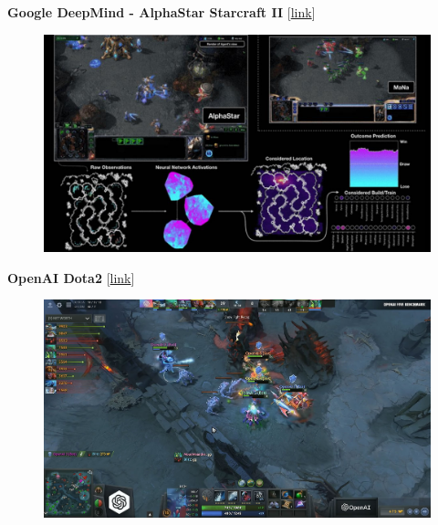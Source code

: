 \documentclass[10pt, compress]{beamer}
\begin{document}
\begin{frame}
  \vspace{.6cm}
  \textbf{Google DeepMind - AlphaStar Starcraft II} [\href{https://deepmind.com/blog/alphastar-mastering-real-time-strategy-game-starcraft-ii/}{link}] \\

  \vspace{.6cm}
  \begin{figure}
    \includegraphics[width=.9\linewidth]{imgs/news/alphastar}
  \end{figure}
\end{frame}

\begin{frame}
  \vspace{.6cm}
  \textbf{OpenAI Dota2} [\href{https://openai.com/blog/dota-2/}{link}] \\

  \vspace{.6cm}
  \begin{figure}
    \includegraphics[width=.9\linewidth]{imgs/news/openai}
  \end{figure}
\end{frame}
\end{document}
